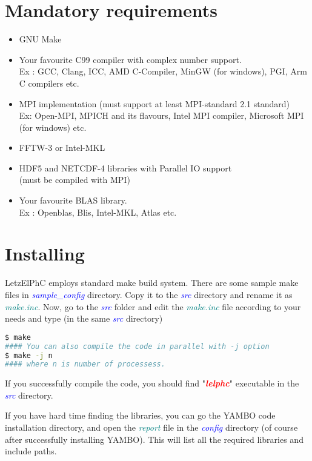 \documentclass[12pt,twoside,openany]{book}
\begin{document}
\section{Mandatory requirements}
\begin{itemize}
        \item GNU Make
	\item Your favourite C99 compiler with complex number support. \\Ex : GCC,         Clang, ICC, AMD C-Compiler, MinGW (for windows), PGI, Arm C compilers etc.
	\item MPI implementation (must support at least MPI-standard 2.1 standard)\\
            Ex: Open-MPI, MPICH and its flavours, Intel MPI compiler, Microsoft MPI (for windows) etc.
	\item FFTW-3 or Intel-MKL
	\item HDF5 and NETCDF-4 libraries with Parallel IO support \\(must be compiled with MPI)
	\item Your favourite BLAS library.\\
            Ex : Openblas, Blis, Intel-MKL, Atlas etc.
\end{itemize}

\section{Installing}
LetzElPhC employs standard make build system. There are some sample make files in {{\textcolor{blue}{\emph{sample\_config}}}} directory. Copy it to the {{\textcolor{blue}{\emph{src}}}} directory and rename it as {\textcolor{teal}{\emph{make.inc}}}. Now, go to the {{\textcolor{blue}{\emph{src}}}} folder and edit the {\textcolor{teal}{\emph{make.inc}}} file according to your needs and type (in the same {{\textcolor{blue}{\emph{src}}}} directory)
\begin{lstlisting}[language=bash]
$ make
#### You can also compile the code in parallel with -j option
$ make -j n 
#### where n is number of processess.
\end{lstlisting}
If you successfully compile the code, you should find "{\bf \textcolor{red}{\emph{lelphc}}}" executable in the {{\textcolor{blue}{\emph{src}}}} directory.


If you have hard time finding the libraries, you can go the YAMBO code installation directory, and open the {\textcolor{teal}{\emph{report}}} file in the {\textcolor{blue}{\emph{config}}} directory (of course after successfully installing YAMBO). This will list all the required libraries and include paths.
\end{document}

